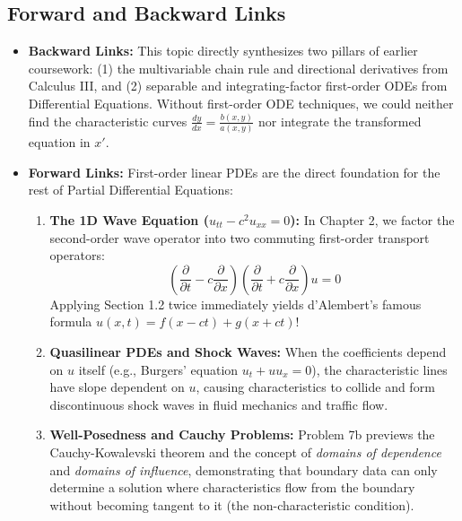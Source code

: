 \documentclass[11pt]{article}
\begin{document}
\subsection{Forward and Backward Links}
\begin{itemize}
    \item \textbf{Backward Links:} This topic directly synthesizes two pillars of earlier coursework: (1) the multivariable chain rule and directional derivatives from Calculus III, and (2) separable and integrating-factor first-order ODEs from Differential Equations. Without first-order ODE techniques, we could neither find the characteristic curves $\frac{dy}{dx} = \frac{b(x,y)}{a(x,y)}$ nor integrate the transformed equation in $x'$.
    \item \textbf{Forward Links:} First-order linear PDEs are the direct foundation for the rest of Partial Differential Equations:
    \begin{enumerate}
        \item \textbf{The 1D Wave Equation ($u_{tt} - c^2 u_{xx} = 0$):} In Chapter 2, we factor the second-order wave operator into two commuting first-order transport operators:
        \[
        \left(\frac{\partial}{\partial t} - c\frac{\partial}{\partial x}\right)\left(\frac{\partial}{\partial t} + c\frac{\partial}{\partial x}\right)u = 0
        \]
        Applying Section 1.2 twice immediately yields d'Alembert's famous formula $u(x, t) = f(x - ct) + g(x + ct)$!
        \item \textbf{Quasilinear PDEs and Shock Waves:} When the coefficients depend on $u$ itself (e.g., Burgers' equation $u_t + u u_x = 0$), the characteristic lines have slope dependent on $u$, causing characteristics to collide and form discontinuous shock waves in fluid mechanics and traffic flow.
        \item \textbf{Well-Posedness and Cauchy Problems:} Problem 7b previews the Cauchy-Kowalevski theorem and the concept of \emph{domains of dependence} and \emph{domains of influence}, demonstrating that boundary data can only determine a solution where characteristics flow from the boundary without becoming tangent to it (the non-characteristic condition).
    \end{enumerate}
\end{itemize}

\newpage
\end{document}
